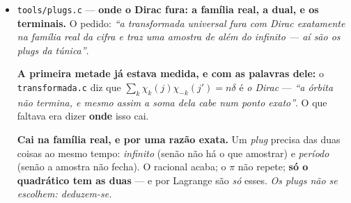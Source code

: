 \documentclass[11pt]{article}
\newcommand{\code}[1]{\texttt{\small #1}}
\theoremstyle{plain}
\theoremstyle{remark}
\begin{document}
\begin{itemize}
\textbf{E o $\sqrt N$ tem alcance, que o mesmo revisor delimitou.} As raízes do metal não estão no
círculo ($\varphi$ e $1/\varphi$), e \emph{nenhum} expoente torna a matriz de avaliação unitária.
Mas elas são \textbf{recíprocas} --- $|\sigma|\,|\sigma'| = 1$, exato --- e é aí que se apontou: \emph{a base é ortonormal na norma multiplicativa, a da cifra}. O $\sqrt N$ é da norma
\textbf{aditiva}, e ele é \emph{a base da agulha que mede sem invadir o invariante}: a projeção
ortogonal é idempotente e o resto fica perpendicular. \emph{O objeto é multiplicativo, a agulha é
aditiva --- e é por viverem em normas diferentes que uma pode medir a outra sem a tocar.}

\textbf{A deconvolução existe sse nenhuma casa se anula}, e isso é decidível numa varredura. O
núcleo constante anula $15$ de $16$ --- \emph{é o que não tem dual, e fica na garrafa}.

\textbf{§U7 --- e o corpo universal É AUTODUAL, verificado:} $\mathcal{F}^4 = \mathrm{id}$
(ordem 4 --- \emph{o $i$, que roda}), $\mathcal{F}^2$ é \emph{exatamente} a reflexão $n\to-n$
(ordem 2 --- \emph{o $J$, que espelha}), e \textbf{há vetores iguais à sua própria transformada}
--- constroem-se somando a órbita, e a gaussiana é o exemplo clássico ($1{,}74\%$ no discreto, exato
no contínuo). \emph{Autodual significa que a transformada não sai do corpo: um corpo que precisasse
de outro para se transformar não seria universal --- teria de haver um terceiro para fechar, e
depois um quarto.} \textbf{15 unidades, resíduo 0.}


\item \code{tools/plugs.c} --- \textbf{onde o Dirac fura: a família real, a dual, e os terminais.}
O pedido: \emph{``a transformada universal fura com Dirac exatamente na família real da cifra e traz
uma amostra de além do infinito --- aí são os plugs da túnica''}.

\textbf{A primeira metade já estava medida, e com as palavras dele:} o \code{transformada.c} diz que
$\sum_k\chi_k(j)\chi_{-k}(j')=n\delta$ é \emph{o Dirac} --- \emph{``a órbita não termina, e mesmo
assim a soma dela cabe num ponto exato''}. O que faltava era dizer \textbf{onde} isso cai.

\textbf{Cai na família real, e por uma razão exata.} Um \emph{plug} precisa das duas coisas ao mesmo
tempo: \emph{infinito} (senão não há o que amostrar) e \emph{período} (senão a amostra não fecha).
O racional acaba; o $\pi$ não repete; \textbf{só o quadrático tem as duas} --- e por Lagrange são
\emph{só} esses. \emph{Os plugs não se escolhem: deduzem-se.}


\end{itemize}
\end{document}
